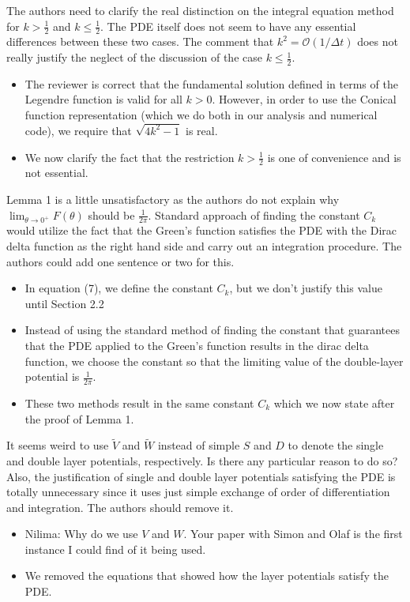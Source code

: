 \documentclass[11pt]{article}
\newcommand{\comment}[1]{{\color{blue} #1}}
\newcommand{\todo}[1]{{\color{red} #1}}
\begin{document}
\comment{The authors need to clarify the real distinction on the
integral equation method for $k > \frac{1}{2}$ and $k \leq
\frac{1}{2}$.  The PDE itself does not seem to have any essential
differences between these two cases. The comment that $k^{2} =
\mathcal{O}(1/\Delta t)$ does not really justify the neglect of the
discussion of the case $k\leq\frac{1}{2}.$}
\begin{itemize}
  \item The reviewer is correct that the fundamental solution defined in
  terms of the Legendre function is valid for all $k > 0$.  However, in
  order to use the Conical function representation (which we do both in
  our analysis and numerical code), we require that $\sqrt{4k^{2}-1}$ is
  real.
  \item We now clarify the fact that the restriction $k > \frac{1}{2}$
  is one of convenience and is not essential.
\end{itemize}

\comment{Lemma 1 is a little unsatisfactory as the authors do not
explain why $\lim_{\theta \rightarrow 0^{+}}F(\theta)$ should be
$\frac{1}{2\pi}$.  Standard approach of finding the constant $C_{k}$
would utilize the fact that the Green’s function satisfies the PDE with
the Dirac delta function as the right hand side and carry out an
integration procedure. The authors could add one sentence or two for
this.}
\begin{itemize}
  \item In equation (7), we define the constant $C_{k}$, but we don't
  justify this value until Section 2.2
  \item Instead of using the standard method of finding the constant
  that guarantees that the PDE applied to the Green's function results
  in the dirac delta function, we choose the constant so that the
  limiting value of the double-layer potential is $\frac{1}{2\pi}$.
  \item These two methods result in the same constant $C_{k}$ which we
  now state after the proof of Lemma 1.
\end{itemize}

\comment{It seems weird to use $\tilde{V}$ and $\tilde{W}$ instead of
simple $S$ and $D$ to denote the single and double layer potentials,
respectively. Is there any particular reason to do so?  Also, the
justification of single and double layer potentials satisfying the PDE
is totally unnecessary since it uses just simple exchange of order of
differentiation and integration.  The authors should remove it.}
\begin{itemize}
  \item \todo{Nilima: Why do we use $V$ and $W$.  Your paper with Simon
  and Olaf is the first instance I could find of it being used.}
  \item We removed the equations that showed how the layer potentials
  satisfy the PDE.
\end{itemize}
\end{document}
